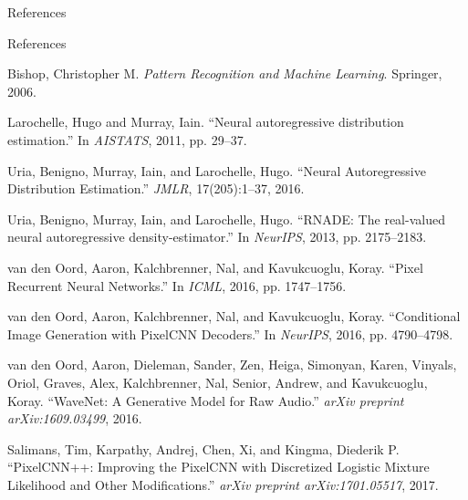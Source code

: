 \begin{frame}[allowframebreaks]{}
    \centering
    \LARGE References
\end{frame}

\begin{frame}[allowframebreaks]{References}
\begin{thebibliography}{9}
Bishop, Christopher M. \emph{Pattern Recognition and Machine Learning}. Springer, 2006.

Larochelle, Hugo and Murray, Iain. ``Neural autoregressive distribution estimation.'' In \emph{AISTATS}, 2011, pp. 29--37.

Uria, Benigno, Murray, Iain, and Larochelle, Hugo. ``Neural Autoregressive Distribution Estimation.'' \emph{JMLR}, 17(205):1--37, 2016.

Uria, Benigno, Murray, Iain, and Larochelle, Hugo. ``RNADE: The real-valued neural autoregressive density-estimator.'' In \emph{NeurIPS}, 2013, pp. 2175--2183.

van den Oord, Aaron, Kalchbrenner, Nal, and Kavukcuoglu, Koray. ``Pixel Recurrent Neural Networks.'' In \emph{ICML}, 2016, pp. 1747--1756.

van den Oord, Aaron, Kalchbrenner, Nal, and Kavukcuoglu, Koray. ``Conditional Image Generation with PixelCNN Decoders.'' In \emph{NeurIPS}, 2016, pp. 4790--4798.

van den Oord, Aaron, Dieleman, Sander, Zen, Heiga, Simonyan, Karen, Vinyals, Oriol, Graves, Alex, Kalchbrenner, Nal, Senior, Andrew, and Kavukcuoglu, Koray. ``WaveNet: A Generative Model for Raw Audio.'' \emph{arXiv preprint arXiv:1609.03499}, 2016.

Salimans, Tim, Karpathy, Andrej, Chen, Xi, and Kingma, Diederik P. ``PixelCNN++: Improving the PixelCNN with Discretized Logistic Mixture Likelihood and Other Modifications.'' \emph{arXiv preprint arXiv:1701.05517}, 2017.
\end{thebibliography}
\end{frame}

